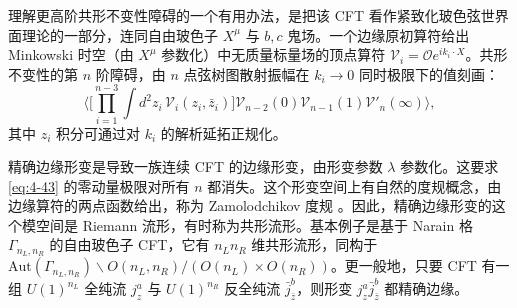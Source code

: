 
理解更高阶共形不变性障碍的一个有用办法，是把该 CFT 看作紧致化玻色弦世界面理论的一部分，连同自由玻色子 $X^\mu$ 与 $b,c$ 鬼场。一个边缘原初算符给出 Minkowski 时空（由 $X^\mu$ 参数化）中无质量标量场的顶点算符 $\mathcal{V}_i=\mathcal{O}e^{ik_i\cdot X}$。共形不变性的第 $n$ 阶障碍，由 $n$ 点弦树图散射振幅在 $k_i\to0$ 同时极限下的值刻画：
\begin{equation}
  \label{eq:4-43}
  \Big\langle\Big[\prod_{i=1}^{n-3}\int d^2z_i\,\mathcal{V}_i(z_i,\bar z_i)\Big]
  \mathcal{V}_{n-2}(0)\mathcal{V}_{n-1}(1)\mathcal{V}'_n(\infty)\Big\rangle,
\end{equation}
其中 $z_i$ 积分可通过对 $k_i$ 的解析延拓正规化。


精确边缘形变是导致一族连续 CFT 的边缘形变，由形变参数 $\lambda$ 参数化。这要求 \eqref{eq:4-43} 的零动量极限对所有 $n$ 都消失。这个形变空间上有自然的度规概念，由边缘算符的两点函数给出，称为 Zamolodchikov 度规 \cite{r36}。因此，精确边缘形变的这个模空间是 Riemann 流形，有时称为共形流形。基本例子是基于 Narain 格 $\Gamma_{n_L,n_R}$ 的自由玻色子 CFT，它有 $n_Ln_R$ 维共形流形，同构于 $\mathrm{Aut}(\Gamma_{n_L,n_R})\backslash O(n_L,n_R)/(O(n_L)\times O(n_R))$。更一般地，只要 CFT 有一组 $U(1)^{n_L}$ 全纯流 $j^a_z$ 与 $U(1)^{n_R}$ 反全纯流 $\bar j^b_{\bar z}$，则形变 $j^a_z\bar j^b_{\bar z}$ 都精确边缘。


